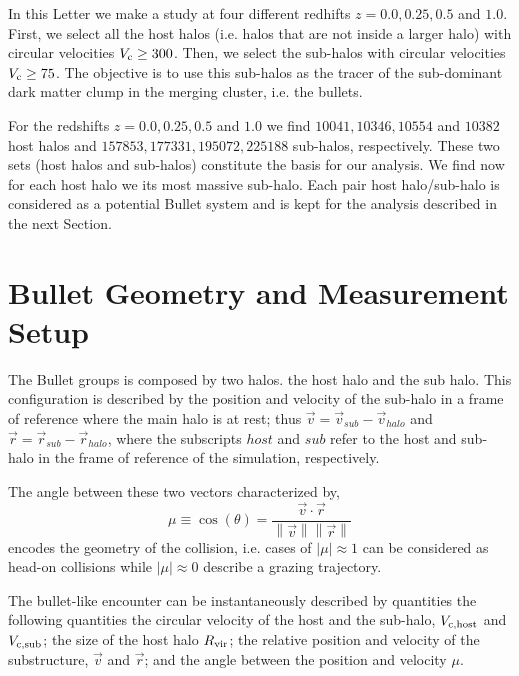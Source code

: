 \documentclass{emulateapj}
\newcommand{\kms}{{\ifmmode{{\mathrm{\,km\ s}^{-1}}}\else{\,km~s$^{-1}$}\fi}}
\begin{document}
In this Letter we make a study at four different redhifts $z=0.0,0.25,
0.5$ and $1.0$. First, we select all the host halos (i.e. halos that
are not inside a larger halo) with circular velocities $V_{\rm c}\geq
300$\kms. Then, we select the sub-halos with circular velocities
$V_{\rm c}\geq 75$\kms. The objective is to use this sub-halos as the
tracer of the sub-dominant dark matter clump in the merging cluster,
i.e. the bullets.

For the redshifts $z=0.0,0.25,
0.5$ and $1.0$ we find $10041, 10346, 10554$ and $10382$ host halos
and $157853, 177331, 195072, 225188$ sub-halos, respectively. These
two sets (host halos and sub-halos) constitute the basis for our
analysis. We find now for each host halo we its most massive sub-halo. Each pair
host halo/sub-halo is considered as a potential Bullet system and is
kept for the analysis described in the next Section. 

\section{Bullet Geometry and Measurement Setup}
\label{sec:setup}

The Bullet groups is composed by two halos. the host halo and the sub
halo. This configuration is described by the position and velocity of
the sub-halo in a frame of reference where the main halo is at rest;
thus  $\vec{v{}}=\vec{v}_{sub}-\vec{v}_{halo}$ and 
$\vec{r}=\vec{r}_{sub}-\vec{r}_{halo}$, where the subscripts $host$
and $sub$ refer to the host and sub-halo in the frame of reference of
the simulation, respectively.

The angle between these two vectors characterized by, 
\begin{equation}
  \mu\equiv
  \cos(\theta)=\frac{\vec{v{}}\cdotp{}\vec{r}}{\left\|\vec{v}{}\right\|
    \left\|\vec{r}\right\|} 
 \end{equation} 
%
encodes the geometry of the collision, i.e. cases of $|\mu|\approx 1$
can be considered as head-on collisions while $|\mu|\approx 0$
describe a grazing trajectory.

The bullet-like encounter can be instantaneously described by
quantities the following quantities the circular velocity of the host
and the sub-halo, $V_{\rm c,host}$ and $V_{\rm c,  sub}$; the size of
the host halo $R_{\rm vir}$; the relative position and velocity of the
substructure, $\vec{v}$ and $\vec{r}$; and the angle between the
position and velocity $\mu$. 
\end{document}
